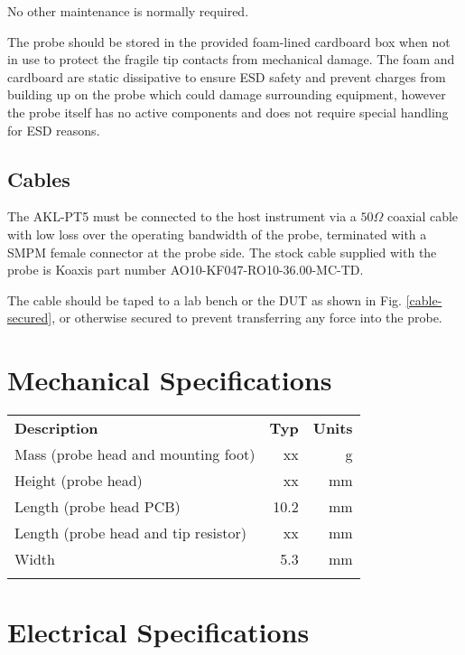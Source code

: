 \documentclass[11pt]{article}
\newcommand{\thinhline}{\Xhline{1\arrayrulewidth}}
\newcommand{\thickhline}{\Xhline{2.5\arrayrulewidth}}
\begin{document}
No other maintenance is normally required.

The probe should be stored in the provided foam-lined cardboard box when not in use to protect the fragile tip contacts
from mechanical damage. The foam and cardboard are static dissipative to ensure ESD safety and prevent charges from
building up on the probe which could damage surrounding equipment, however the probe itself has no active components
and does not require special handling for ESD reasons.

\FloatBarrier
\subsection{Cables}

The AKL-PT5 must be connected to the host instrument via a $50 \Omega$ coaxial cable with low loss over the operating
bandwidth of the probe, terminated with a SMPM female connector at the probe side. The stock cable supplied with the
probe is Koaxis part number AO10-KF047-RO10-36.00-MC-TD.

The cable should be taped to a lab bench or the DUT as shown in Fig. \ref{cable-secured}, or otherwise secured to
prevent transferring any force into the probe.


\pagebreak
\section{Mechanical Specifications}

\begin{tabularx}{10cm}{Xrr}
\thickhline
\textbf{Description} & \textbf{Typ} & \textbf{Units} \\
\thickhline
Mass (probe head and mounting foot) & xx & g\\
\thinhline
Height (probe head) & xx & mm\\
\thinhline
Length (probe head PCB) & 10.2 & mm\\
\thinhline
Length (probe head and tip resistor) & xx & mm\\
\thinhline
Width & 5.3 & mm\\
\thickhline
\end{tabularx}

\pagebreak
\section{Electrical Specifications}
\end{document}
